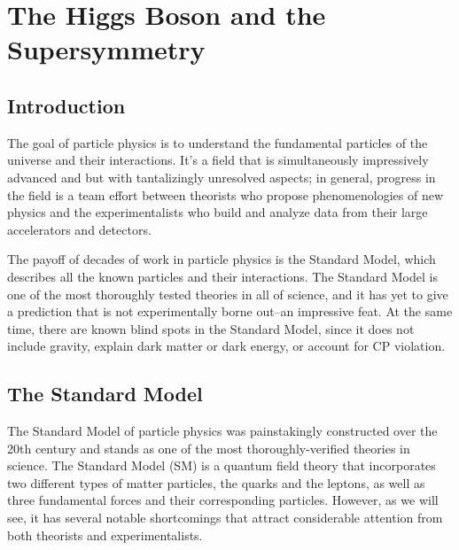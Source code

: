  

\chapter[Theory]{The Higgs Boson and the Supersymmetry}
\label{chapter:Theory}



\section{Introduction}
The goal of particle physics is to understand the fundamental particles of the universe and their interactions. It's a field that is simultaneously impressively advanced and but with tantalizingly unresolved aspects; in general, progress in the field is a team effort between theorists who propose phenomenologies of new physics and the experimentalists who build and analyze data from their large accelerators and detectors.  

The payoff of decades of work in particle physics is the Standard Model, which describes all the known particles and their interactions.  The Standard Model is one of the most thoroughly tested theories in all of science, and it has yet to give a prediction that is not experimentally borne out--an impressive feat.  At the same time, there are known blind spots in the Standard Model, since it does not include gravity, explain dark matter or dark energy, or account for CP violation.   


\section{The Standard Model}
The Standard Model of particle physics was painstakingly constructed over the 20th century and stands as one of the most thoroughly-verified theories in science.  The Standard Model (SM) is a quantum field theory that incorporates two different types of matter particles, the quarks and the leptons, as well as three fundamental forces and their corresponding particles.  However, as we will see, it has several notable shortcomings that attract considerable attention from both theorists and experimentalists.  

